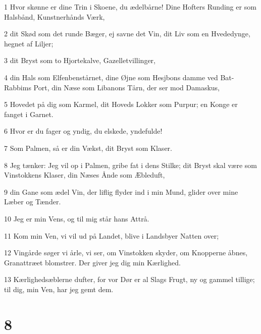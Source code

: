 \par 1 Hvor skønne er dine Trin i Skoene, du ædelbårne! Dine Hofters Runding er som Halsbånd, Kunstnerhånds Værk,
\par 2 dit Skød som det runde Bæger, ej savne det Vin, dit Liv som en Hvededynge, hegnet af Liljer;
\par 3 dit Bryst som to Hjortekalve, Gazelletvillinger,
\par 4 din Hals som Elfenbenstårnet, dine Øjne som Hesjbons damme ved Bat-Rabbims Port, din Næse som Libanons Tårn, der ser mod Damaskus,
\par 5 Hovedet på dig som Karmel, dit Hoveds Lokker som Purpur; en Konge er fanget i Garnet.
\par 6 Hvor er du fager og yndig, du elskede, yndefulde!
\par 7 Som Palmen, så er din Vækst, dit Bryst som Klaser.
\par 8 Jeg tænker: Jeg vil op i Palmen, gribe fat i dens Stilke; dit Bryst skal være som Vinstokkens Klaser, din Næses Ånde som Æbleduft,
\par 9 din Gane som ædel Vin, der liflig flyder ind i min Mund, glider over mine Læber og Tænder.
\par 10 Jeg er min Vens, og til mig står hans Attrå.
\par 11 Kom min Ven, vi vil ud på Landet, blive i Landsbyer Natten over;
\par 12 Vingårde søger vi årle, vi ser, om Vinstokken skyder, om Knopperne åbnes, Granattræet blomstrer. Der giver jeg dig min Kærlighed.
\par 13 Kærlighedsæblerne dufter, for vor Dør er al Slags Frugt, ny og gammel tillige; til dig, min Ven, har jeg gemt dem.

\chapter{8}

